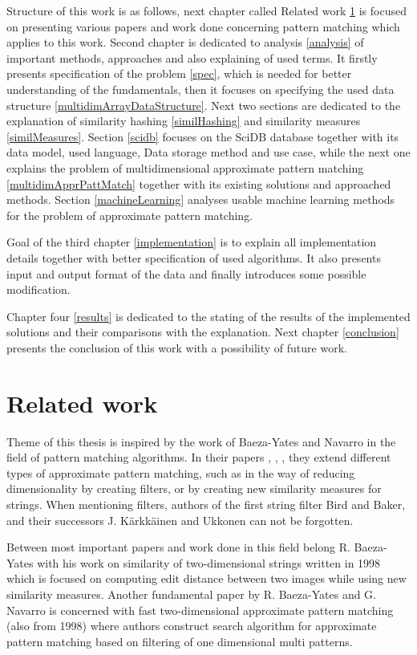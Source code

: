 Structure of this work is as follows, next chapter called Related work \ref{relatedWork} is focused on presenting various papers and work done concerning pattern matching which applies to this work. Second chapter is dedicated to analysis \ref{analysis} of important methods, approaches and also explaining of used terms. It firstly presents specification of the problem \ref{spec}, which is needed for better understanding of the fundamentals, then it focuses on specifying the used data structure \ref{multidimArrayDataStructure}. Next two sections are dedicated to the explanation of similarity hashing \ref{similHashing} and similarity measures \ref{similMeasures}. Section \ref{scidb} focuses on the SciDB database together with its data model, used language, Data storage method and use case, while the next one explains the problem of multidimensional approximate pattern matching \ref{multidimApprPattMatch} together with its existing solutions and approached methods. Section \ref{machineLearning} analyses usable machine learning methods for the problem of approximate pattern matching.

Goal of the third chapter \ref{implementation} is to explain all implementation details together with better specification of used algorithms. It also presents input and output format of the data and finally introduces some possible modification.

Chapter four \ref{results} is dedicated to the stating of the results of the implemented solutions and their comparisons with the explanation. Next chapter \ref{conclusion} presents the conclusion of this work with a possibility of future work. 


\chapter{Related work} \label{relatedWork}
Theme of this thesis is inspired by the work of Baeza-Yates and Navarro in the field of pattern matching algorithms. In their papers \cite{mdApproxPM}, \cite{fast2DapproxPM}, \cite{fastMDApproxPM}, they extend different types of approximate pattern matching, such as in the way of reducing dimensionality by creating filters, or by creating new similarity measures for strings. When mentioning filters, authors of the first string filter Bird and Baker, and their successors J. K{\" a}rkk{\" a}inen and Ukkonen can not be forgotten.

Between most important papers and work done in this field belong R. Baeza-Yates with his work on similarity of two-dimensional strings written in 1998 \cite{sim2Dstrings} which is focused on computing edit distance between two images while using new similarity measures. Another fundamental paper by R. Baeza-Yates and G. Navarro \cite{fast2DapproxPM} is concerned with fast two-dimensional approximate pattern matching (also from 1998) where authors construct search algorithm for approximate pattern matching based on filtering of one dimensional multi patterns.

